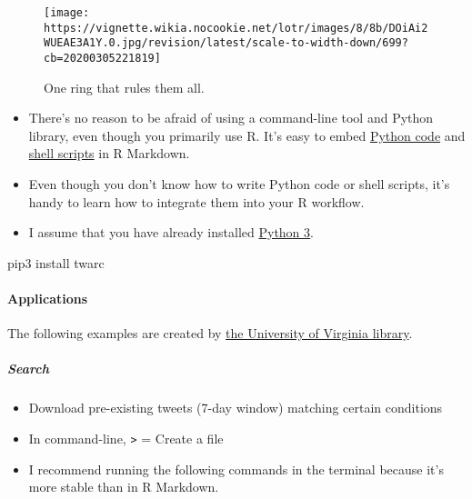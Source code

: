 \documentclass[
]{book}
\newenvironment{Shaded}{\begin{snugshade}}{\end{snugshade}}
\newcommand{\ExtensionTok}[1]{#1}
\newcommand{\NormalTok}[1]{#1}
\begin{document}
\begin{figure}
\centering
\texttt{[image: https://vignette.wikia.nocookie.net/lotr/images/8/8b/DOiAi2WUEAE3A1Y.0.jpg/revision/latest/scale-to-width-down/699?cb=20200305221819]}
\caption{One ring that rules them all.}
\end{figure}

\begin{itemize}
\item
  There's no reason to be afraid of using a command-line tool and Python library, even though you primarily use R. It's easy to embed \href{https://bookdown.org/yihui/rmarkdown/language-engines.html\#python}{Python code} and \href{https://bookdown.org/yihui/rmarkdown/language-engines.html\#shell-scripts}{shell scripts} in R Markdown.
\item
  Even though you don't know how to write Python code or shell scripts, it's handy to learn how to integrate them into your R workflow.
\item
  I assume that you have already installed \href{https://www.python.org/download/releases/3.0/}{Python 3}.
\end{itemize}

\begin{Shaded}
\begin{Highlighting}[]
\ExtensionTok{pip3}\NormalTok{ install twarc}
\end{Highlighting}
\end{Shaded}

\hypertarget{applications-1}{%
\paragraph{Applications}\label{applications-1}}

The following examples are created by \href{http://digitalcollecting.lib.virginia.edu/toolkit/docs/social-media/twarc-commands/}{the University of Virginia library}.

\hypertarget{search}{%
\subparagraph{Search}\label{search}}

\begin{itemize}
\item
  Download pre-existing tweets (7-day window) matching certain conditions
\item
  In command-line, \texttt{\textgreater{}} = Create a file
\item
  I recommend running the following commands in the terminal because it's more stable than in R Markdown.
\end{itemize}
\end{document}
